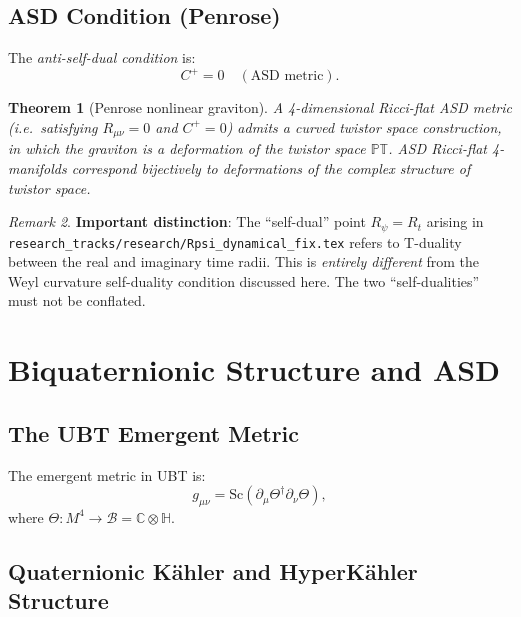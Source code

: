 \documentclass[11pt,a4paper]{article}
\newtheorem{theorem}{Theorem}[section]
\theoremstyle{definition}
\theoremstyle{remark}
\newtheorem{remark}[theorem]{Remark}
\begin{document}
\subsection{ASD Condition (Penrose)}

The \emph{anti-self-dual condition} is:
\begin{equation}
  C^+ = 0 \quad (\text{ASD metric}).
  \label{eq:asd_condition}
\end{equation}

\begin{theorem}[Penrose nonlinear graviton]
A 4-dimensional Ricci-flat ASD metric (i.e.\ satisfying $R_{\mu\nu} = 0$ and
$C^+ = 0$) admits a curved twistor space construction, in which the graviton
is a deformation of the twistor space $\mathbb{P}\mathbb{T}$.  ASD Ricci-flat
4-manifolds correspond bijectively to deformations of the complex structure of
twistor space.
\end{theorem}

\begin{remark}
\textbf{Important distinction}: The ``self-dual'' point $R_\psi = R_t$ arising
in \texttt{research\_tracks/research/Rpsi\_dynamical\_fix.tex} refers to
T-duality between the real and imaginary time radii.  This is \emph{entirely
different} from the Weyl curvature self-duality condition discussed here.
The two ``self-dualities'' must not be conflated.
\end{remark}

\section{Biquaternionic Structure and ASD}
\label{sec:biquaternion_asd}

\subsection{The UBT Emergent Metric}

The emergent metric in UBT is:
\begin{equation}
  g_{\mu\nu} = \mathrm{Sc}(\partial_\mu\Theta^\dagger\partial_\nu\Theta),
  \label{eq:metric}
\end{equation}
where $\Theta: M^4 \to \mathcal{B} = \mathbb{C}\otimes\mathbb{H}$.

\subsection{Quaternionic Kähler and HyperKähler Structure}
\end{document}
